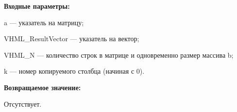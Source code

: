 \textbf{Входные параметры:}  
 
a --- указатель на матрицу;
 
VHML\_ResultVector --- указатель на вектор;
 
VHML\_N --- количество строк в матрице и одновременно размер массива b;
 
k --- номер копируемого столбца (начиная с 0).

\textbf{Возвращаемое значение:}

Отсутствует.